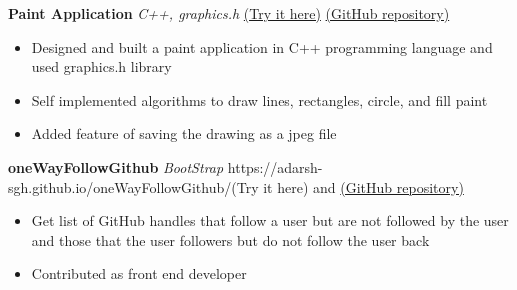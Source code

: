 \documentclass[a4paper]{article}
\begin{document}
{\textbf{Paint Application}} {\sl C++, graphics.h} \hfill  \href{https://github.com/sahil19-19/Paint-Application/releases}{(Try it here)}  \href{https://github.com/sahil19-19/Paint-Application}{(GitHub repository)}\\
\begin{itemize}
	\item Designed and built a paint application in C++ programming language and used graphics.h library
	\item Self implemented algorithms to draw lines, rectangles, circle, and fill paint 
    \item Added feature of saving the drawing as a jpeg file
\end{itemize}
\vspace*{1.5mm}


{\textbf{oneWayFollowGithub}} {\sl BootStrap} \hfill {https://adarsh-sgh.github.io/oneWayFollowGithub/}{(Try it here)} and \href{https://github.com/sahil19-19/oneWayFollowGithub}{ (GitHub repository)}\\
\begin{itemize}
	\item Get list of GitHub handles that follow a user but are not followed by the user and those that the user followers
    but do not follow the user back
	\item Contributed as front end developer
\end{itemize}
\vspace*{1.5mm}

\end{document}
